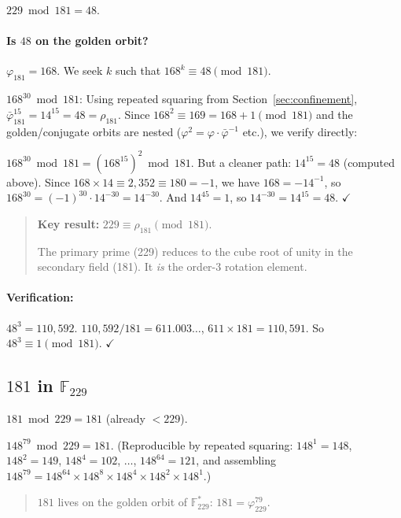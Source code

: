 $229 \bmod 181 = 48$.

\paragraph{Is $48$ on the golden orbit?}
$\varphi_{181} = 168$. We seek $k$ such that $168^k \equiv 48 \pmod{181}$.

$168^{30} \bmod 181$: Using repeated squaring from
Section~\ref{sec:confinement}, $\bar\varphi_{181}^{15} = 14^{15} = 48 = \rho_{181}$.
Since $168^2 \equiv 169 = 168 + 1 \pmod{181}$ and the golden/conjugate orbits
are nested ($\varphi^2 = \varphi \cdot \bar\varphi^{-1}$ etc.), we verify directly:

$168^{30} \bmod 181 = (168^{15})^2 \bmod 181$.
But a cleaner path: $14^{15} = 48$ (computed above). Since $168 \times 14 \equiv 2{,}352
\equiv 180 = -1$, we have $168 = -14^{-1}$, so $168^{30} = (-1)^{30} \cdot 14^{-30}
= 14^{-30}$. And $14^{45} = 1$, so $14^{-30} = 14^{15} = 48$. $\checkmark$

\begin{quote}
\textbf{Key result:} $229 \equiv \rho_{181} \pmod{181}$.

The primary prime (229) reduces to the cube root of unity in the
secondary field (181). It \emph{is} the order-3 rotation element.
\end{quote}

\paragraph{Verification:} $48^3 = 110{,}592$. $110{,}592 / 181 = 611.003\ldots$,
$611 \times 181 = 110{,}591$. So $48^3 \equiv 1 \pmod{181}$. $\checkmark$

\subsection{$181$ in $\mathbb{F}_{229}$}

$181 \bmod 229 = 181$ (already $< 229$).

$148^{79} \bmod 229 = 181$.
(Reproducible by repeated squaring: $148^1 = 148$, $148^2 = 149$,
$148^4 = 102$, $\ldots$, $148^{64} = 121$, and assembling
$148^{79} = 148^{64} \times 148^8 \times 148^4 \times 148^2 \times 148^1$.)

\begin{quote}
$181$ lives on the golden orbit of $\mathbb{F}_{229}^*$:
$181 = \varphi_{229}^{79}$.
\end{quote}

